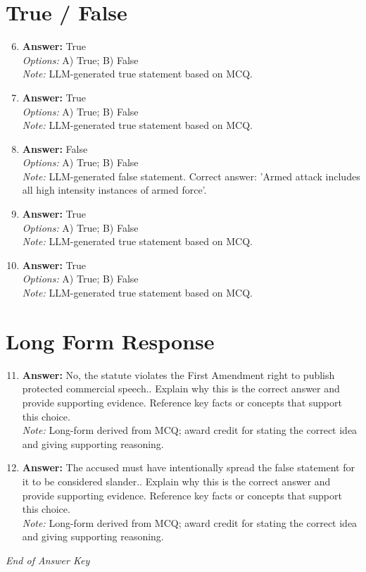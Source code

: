 \documentclass[12pt]{article}
\begin{document}
\section*{True / False}
\begin{enumerate}[label=\arabic*.]
\setcounter{enumi}{5}
\item \textbf{Answer:} True
\\ \textit{Options:} A) True; B) False
\\ \textit{Note:} LLM-generated true statement based on MCQ.
\item \textbf{Answer:} True
\\ \textit{Options:} A) True; B) False
\\ \textit{Note:} LLM-generated true statement based on MCQ.
\item \textbf{Answer:} False
\\ \textit{Options:} A) True; B) False
\\ \textit{Note:} LLM-generated false statement. Correct answer: 'Armed attack includes all high intensity instances of armed force'.
\item \textbf{Answer:} True
\\ \textit{Options:} A) True; B) False
\\ \textit{Note:} LLM-generated true statement based on MCQ.
\item \textbf{Answer:} True
\\ \textit{Options:} A) True; B) False
\\ \textit{Note:} LLM-generated true statement based on MCQ.
\end{enumerate}

\section*{Long Form Response}
\begin{enumerate}[label=\arabic*.]
\setcounter{enumi}{10}
\item \textbf{Answer:} No, the statute violates the First Amendment right to publish protected commercial speech.. Explain why this is the correct answer and provide supporting evidence. Reference key facts or concepts that support this choice.
\\ \textit{Note:} Long-form derived from MCQ; award credit for stating the correct idea and giving supporting reasoning.
\item \textbf{Answer:} The accused must have intentionally spread the false statement for it to be considered slander.. Explain why this is the correct answer and provide supporting evidence. Reference key facts or concepts that support this choice.
\\ \textit{Note:} Long-form derived from MCQ; award credit for stating the correct idea and giving supporting reasoning.
\end{enumerate}

\vfill
\noindent\textit{End of Answer Key}
\end{document}
